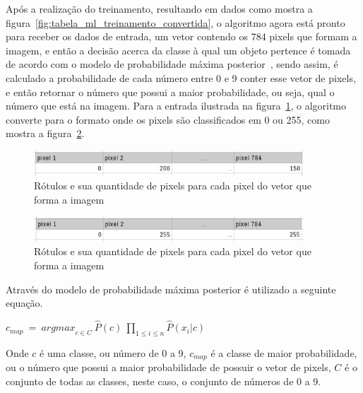 Após a realização do treinamento, resultando em dados como mostra a
figura~\ref{fig:tabela_ml_treinamento_convertida}, o algoritmo agora está pronto para
receber os dados de entrada, um vetor contendo os 784 pixels que formam a imagem, e então
a decisão acerca da classe à qual um objeto pertence é tomada de acordo com o modelo
de probabilidade máxima posterior~\cite{araujo2011apprecommender}, sendo assim, é
calculado a probabilidade de cada número entre 0 e 9 conter esse vetor de pixels, e então
retornar o número que possui a maior probabilidade, ou seja, qual o número que está na
imagem. Para a entrada ilustrada na figura~\ref{fig:bayes_dado_entrada}, o algoritmo
converte para o formato onde os pixels são classificados em 0 ou 255, como mostra a
figura~\ref{fig:bayes_dado_entrada_convertida}.

\begin{figure}[h]
  \centering
  \includegraphics[width=0.9\textwidth]{figuras/bayes_dado_entrada.eps}
  \caption{Rótulos e sua quantidade de pixels para cada pixel do vetor que forma a imagem}
  \label{fig:bayes_dado_entrada}
\end{figure}

\begin{figure}[h]
  \centering
  \includegraphics[width=0.9\textwidth]{figuras/bayes_dado_entrada_convertida.eps}
  \caption{Rótulos e sua quantidade de pixels para cada pixel do vetor que forma a imagem}
  \label{fig:bayes_dado_entrada_convertida}
\end{figure}

Através do modelo de probabilidade máxima posterior é utilizado a seguinte equação.

\begin{center}

$ c_{map} \ = \ {arg max}_{c \in C} \ \hat{P}(c) \ \prod\limits_{1 \leq i \leq n} \hat{P}(x_i | c)  $
\\
\end{center}

Onde $c$ é uma classe, ou número de 0 a 9, $c_{map}$ é a classe de maior probabilidade,
ou o número que possui a maior probabilidade de possuir o vetor de pixels, $C$ é o
conjunto de todas as classes, neste caso, o conjunto de números de 0 a 9.

